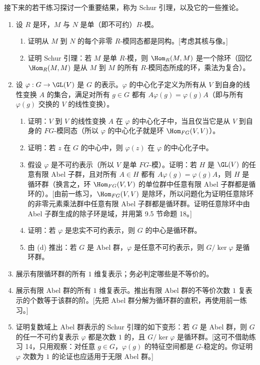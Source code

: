 接下来的若干练习探讨一个重要结果，称为 Schur 引理，以及它的一些推论。
\begin{enumerate}[label=\arabic*.,resume]
  \item 设 $R$ 是环，$M$ 与 $N$ 是单（即不可约）$R$-模。
  \begin{enumerate}[label=(\alph*)]
    \item 证明从 $M$ 到 $N$ 的每个非零 $R$-模同态都是同构。[考虑其核与像。]
    \item 证明 Schur 引理：若 $M$ 是单 $R$-模，则 $\Hom_R(M,M)$ 是一个除环（回忆 $\Hom_R(M,M)$ 是从 $M$ 到 $M$ 的所有 $R$-模同态所成的环，乘法为复合）。
  \end{enumerate}
  \item 设 $\varphi:G\to\GL(V)$ 是 $G$ 的表示。$\varphi$ 的中心化子定义为所有从 $V$ 到自身的线性变换 $A$ 的集合，满足对所有 $g\in G$ 都有 $A\varphi(g)=\varphi(g)A$（即与所有 $\varphi(g)$ 交换的 $V$ 的线性变换）。
  \begin{enumerate}[label=(\alph*)]
    \item 证明：$V$ 到 $V$ 的线性变换 $A$ 在 $\varphi$ 的中心化子中，当且仅当它是从 $V$ 到自身的 $FG$-模同态（所以 $\varphi$ 的中心化子就是环 $\Hom_{FG}(V,V)$）。
    \item 证明：若 $z$ 在 $G$ 的中心中，则 $\varphi(z)$ 在 $\varphi$ 的中心化子中。
    \item 假设 $\varphi$ 是不可约表示（所以 $V$ 是单 $FG$-模）。证明：若 $H$ 是 $\GL(V)$ 的任意有限 Abel 子群，且对所有 $A\in H$ 都有 $A\varphi(g)=\varphi(g)A$，则 $H$ 是循环群（换言之，环 $\Hom_{FG}(V,V)$ 的单位群中任意有限 Abel 子群都是循环的）。[由前一练习，$\Hom_{FG}(V,V)$ 是除环，所以问题化为证明任意除环的非零元素乘法群中任意有限 Abel 子群都是循环群。证明任意除环中由 Abel 子群生成的除子环是域，并用第 9.5 节命题 18。]
    \item 证明：若 $\varphi$ 是忠实不可约表示，则 $G$ 的中心是循环群。
    \item 由 (d) 推出：若 $G$ 是 Abel 群，$\varphi$ 是任意不可约表示，则 $G/\ker\varphi$ 是循环群。
  \end{enumerate}
  \item 展示有限循环群的所有 $1$ 维复表示；务必判定哪些是不等价的。
  \item 展示有限 Abel 群的所有 $1$ 维复表示。推出有限 Abel 群的不等价次数 $1$ 复表示的个数等于该群的阶。[先把 Abel 群分解为循环群的直积，再使用前一练习。]
  \item 证明复数域上 Abel 群表示的 Schur 引理的如下变形：若 $G$ 是 Abel 群，则 $G$ 的任一不可约复表示 $\varphi$ 都是次数 $1$ 的，且 $G/\ker\varphi$ 是循环群。[这可不借助练习 14，只用观察：对任意 $g\in G$，$\varphi(g)$ 的特征空间都是 $G$-稳定的。你证明 $\varphi$ 次数为 $1$ 的论证也应适用于无限 Abel 群。]

\end{enumerate}
